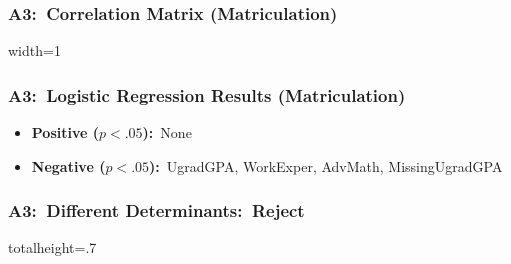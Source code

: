 \documentclass[12pt, aspectratio=169]{beamer}
\begin{document}
\begin{frame}[label=cmm]
\frametitle{A3:\ Correlation Matrix (Matriculation)}
\begin{table}[htbp]
\begin{center}
\caption{Correlation Matrix (Matriculation)}
\vspace{5pt}
\begin{adjustbox}{width=1\textwidth}
\resizebox*{\dimexpr\textwidth-0\baselineskip\relax}{!}{
}
\end{adjustbox}
\end{center}
\end{table}
\hyperlink{rfs}{}
\end{frame}

\begin{frame}[label=lrrm]
\frametitle{A3:\ Logistic Regression Results (Matriculation)}
\centering
\renewcommand{\thetable}{\arabic{table}a}
\vspace{-7.5pt}
\begin{minipage}[t]{0.45\textwidth}
\end{minipage}%
\hfill
\begin{minipage}[c][0.8\textheight][c]{0.55\textwidth}
\begin{itemize}
\item \textbf{Positive ($p<.05$):}\ None
\vspace{10pt}
\item \textbf{Negative ($p<.05$):}\ UgradGPA, WorkExper, AdvMath, MissingUgradGPA
\end{itemize}
\end{minipage}
\raggedright
\hyperlink{pllra}{}
\end{frame}

\begin{frame}[label=wtrd]
\frametitle{A3:\ Different Determinants:\ Reject}
\begin{table}[htbp]
  \centering
  \renewcommand{\thetable}{\arabic{table}a}
  \caption{Wald Test Results (Different)}
  \vspace{5pt}
  \begin{adjustbox}{totalheight=.7\textheight}

  \end{adjustbox}
\end{table}%
\hyperlink{avsa}{}
\end{frame}
\end{document}
